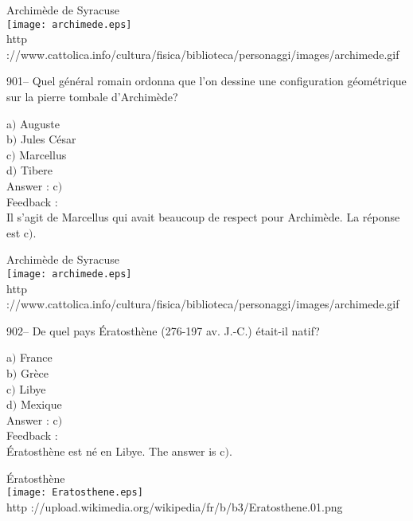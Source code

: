 ﻿\documentclass[letterpaper, 12pt]{article}
\begin{document}
        \begin{center}
        Archim\`ede de Syracuse\\
    \texttt{[image: archimede.eps]}\\
        {\footnotesize http
://www.cattolica.info/cultura/fisica/biblioteca/personaggi/images/archimede.gif}
    \end{center}

901-- Quel g\'en\'eral romain ordonna que l'on dessine une
configuration g\'eom\'etrique sur la pierre tombale d'Archim\`ede?

a$)$ Auguste \\
b$)$ Jules C\'esar \\
c$)$ Marcellus \\
d$)$ Tibere \\

Answer : c$)$\\

Feedback : \\
Il s'agit de Marcellus qui avait beaucoup de respect pour Archim\`ede. La
r\'eponse est c$)$.\\

        \begin{center}
        Archim\`ede de Syracuse\\
    \texttt{[image: archimede.eps]}\\
        {\footnotesize http
://www.cattolica.info/cultura/fisica/biblioteca/personaggi/images/archimede.gif}
    \end{center}

902-- De quel pays \'Eratosth\`ene (276-197 av. J.-C.) \'etait-il
natif?

a$)$ France  \\
b$)$ Gr\`ece  \\
c$)$ Libye \\
d$)$ Mexique \\

Answer : c$)$\\

Feedback : \\
\'Eratosth\`ene est n\'e en Libye. The answer is c$)$.\\

        \begin{center}
        \'Eratosth\`ene\\
    \texttt{[image: Eratosthene.eps]}\\
        {\footnotesize http
://upload.wikimedia.org/wikipedia/fr/b/b3/Eratosthene.01.png}
    \end{center}
\end{document}
